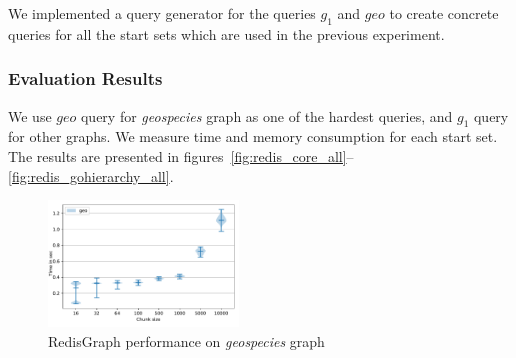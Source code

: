 \begin{algorithm}
\end{algorithm}

We implemented a query generator for the queries $g_1$ and $geo$ to create concrete queries for all the start sets which are used in the previous experiment.


\subsubsection{Evaluation Results}

We use $geo$ query for \textit{geospecies} graph as one of the hardest queries, and $g_1$ query for other graphs.
We measure time and memory consumption for each start set.
The results are presented in figures~\ref{fig:redis_core_all}--\ref{fig:redis_gohierarchy_all}.

%
%
%
%
%

\begin{figure}[h]
\centering
\includegraphics[width=0.45\textwidth]{data/raw_redis/geospecies.pdf}
\caption{RedisGraph performance on \textit{geospecies} graph}
\label{fig:redis_geospecies_all}
\end{figure}


